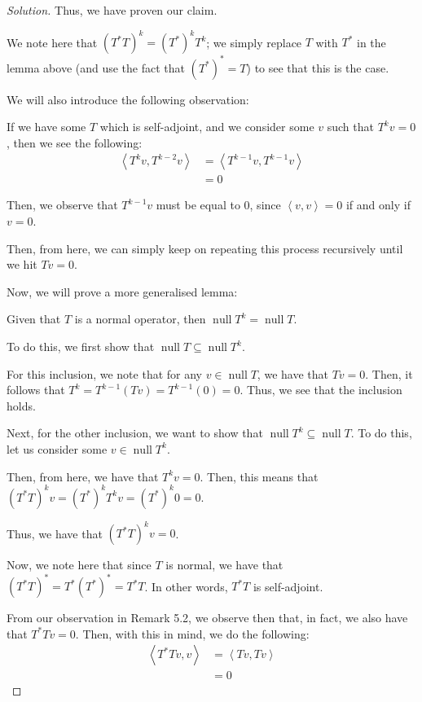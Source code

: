 \documentclass{article}
\newenvironment{solution}{\begin{proof}[Solution]}{\end{proof}}
\renewcommand\qedsymbol{$\blacksquare$}
\newenvironment{innerproof}{\renewcommand{\qedsymbol}{$\square$}\proof}{\endproof}
\DeclareMathOperator*{\vnull}{\mathrm{null}}
\newcommand{\innerproduct}[2]{\left\langle{#1}, {#2}\right\rangle}
\begin{document}
\begin{solution}
\begin{innerproof}
		Thus, we have proven our claim.
	\end{innerproof}

	We note here that $(T^{*}T)^{k} = (T^{*})^{k}T^{k}$; we simply replace $T$ with $T^{*}$ in the lemma above (and use the fact that $(T^{*})^{*} = T$) to see that this is the case.

	We will also introduce the following observation:
	\begin{rmk}
		If we have some $T$ which is self-adjoint, and we consider some $v$ such that $T^{k}v = 0$, then we see the following:
		\begin{align*}
			\innerproduct{T^{k}v}{T^{k-2}v} &= \innerproduct{T^{k-1}v}{T^{k-1}v} \\
			&= 0
		\end{align*}
	
		Then, we observe that $T^{k-1}v$ must be equal to $0$, since $\innerproduct{v}{v} = 0$ if and only if $v = 0$.
		
		Then, from here, we can simply keep on repeating this process recursively until we hit $Tv = 0$.
	\end{rmk}

	Now, we will prove a more generalised lemma:
	\begin{lem}
		Given that $T$ is a normal operator, then $\vnull T^{k} = \vnull T$.
	\end{lem}
	\begin{innerproof}
		To do this, we first show that $\vnull T \subseteq \vnull T^{k}$.
		
		For this inclusion, we note that for any $v \in \vnull T$, we have that $Tv = 0$. Then, it follows that $T^{k} = T^{k-1}(Tv) = T^{k-1}(0) = 0$. Thus, we see that the inclusion holds.
		
		Next, for the other inclusion, we want to show that $\vnull T^{k} \subseteq \vnull T$. To do this, let us consider some $v \in \vnull T^{k}$.
		
		Then, from here, we have that $T^{k}v = 0$. Then, this means that $(T^{*}T)^{k}v = (T^{*})^{k}T^{k}v = (T^{*})^{k}0 = 0$.
		
		Thus, we have that $(T^{*}T)^{k}v = 0$.
		
		Now, we note here that since $T$ is normal, we have that $(T^{*}T)^{*} = T^{*}(T^{*})^{*} = T^{*}T$. In other words, $T^{*}T$ is self-adjoint.
		
		From our observation in Remark 5.2, we observe then that, in fact, we also have that $T^{*}Tv = 0$. Then, with this in mind, we do the following:
		\begin{align*}
			\innerproduct{T^{*}Tv}{v} &= \innerproduct{Tv}{Tv} \\
			&= 0
		\end{align*}
	

\end{innerproof}
\end{solution}
\end{document}
